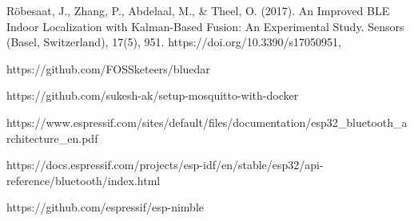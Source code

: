 \documentclass[11pt]{article}
\begin{document}
\begin{thebibliography}{9}

    Röbesaat, J., Zhang, P., Abdelaal, M., \& Theel, O. (2017). An Improved BLE Indoor Localization with Kalman-Based Fusion: An Experimental Study. Sensors (Basel, Switzerland), 17(5), 951. https://doi.org/10.3390/s17050951,

    https://github.com/FOSSketeers/bluedar

    https://github.com/sukesh-ak/setup-mosquitto-with-docker

    https://www.espressif.com/sites/default/files/documentation/esp32\_bluetooth\_architecture\_en.pdf

    https://docs.espressif.com/projects/esp-idf/en/stable/esp32/api-reference/bluetooth/index.html

    https://github.com/espressif/esp-nimble

\end{thebibliography}
\end{document}
